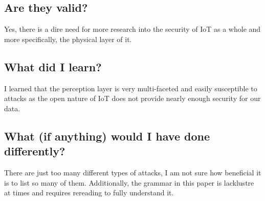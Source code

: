\documentclass[11pt,a4paper]{article}
\begin{document}
\subsection*{Are they valid?}
Yes, there is a dire need for more research into the security of IoT as a whole and more specifically, the physical layer of it. 

\subsection*{What did I learn?}
I learned that the perception layer is very multi-faceted and easily susceptible to attacks as the open nature of IoT does not provide nearly enough security for our data. 

\subsection*{What (if anything) would I have done differently?}
There are just too many different types of attacks, I am not sure how beneficial it is to list so many of them. Additionally, the grammar in this paper is lacklustre at times and requires rereading to fully understand it.
\end{document}
